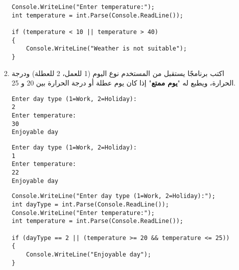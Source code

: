 ﻿\documentclass[12pt]{article}
\begin{document}
\begin{enumerate}[itemsep=3em]
\begin{enumerate}
\ifwithsols
\begin{boxSolution}
\begin{english}
\begin{verbatim}
Console.WriteLine("Enter temperature:");
int temperature = int.Parse(Console.ReadLine());

if (temperature < 10 || temperature > 40)
{
    Console.WriteLine("Weather is not suitable");
}
\end{verbatim}
\end{english}
\end{boxSolution}
\clearpage
\fi
\fi

\item
اكتب برنامجًا يستقبل من المستخدم نوع اليوم (1 للعمل، 2 للعطلة) ودرجة الحرارة، ويطبع له "\textbf{يوم ممتع}" إذا كان يوم عطلة أو درجة الحرارة بين 20 و 25.
\ifdetailed
\begin{boxExample}[1]
\begin{english}
\begin{verbatim}
Enter day type (1=Work, 2=Holiday):
2
Enter temperature:
30
Enjoyable day
\end{verbatim}
\end{english}
\end{boxExample}
\begin{boxExample}[2]
\begin{english}
\begin{verbatim}
Enter day type (1=Work, 2=Holiday):
1
Enter temperature:
22
Enjoyable day
\end{verbatim}
\end{english}
\end{boxExample}

\ifwithsols
\begin{boxSolution}
\begin{english}
\begin{verbatim}
Console.WriteLine("Enter day type (1=Work, 2=Holiday):");
int dayType = int.Parse(Console.ReadLine());
Console.WriteLine("Enter temperature:");
int temperature = int.Parse(Console.ReadLine());

if (dayType == 2 || (temperature >= 20 && temperature <= 25))
{
    Console.WriteLine("Enjoyable day");
}
\end{verbatim}
\end{english}
\end{boxSolution}
\fi
\clearpage
\fi


\end{enumerate}
\end{enumerate}
\end{document}
